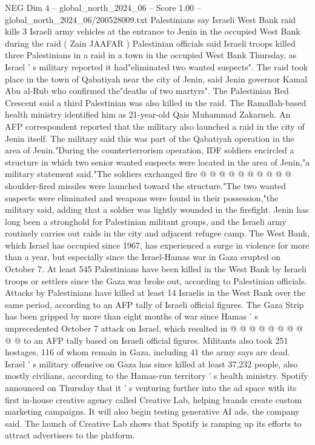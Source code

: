 \begin{textsample}{NEG Dim 4 – global\_north\_2024\_06 – Score 1.00 – global\_north\_2024\_06/200528009.txt}  \label{ex:f4_neg_327}
Palestinians say Israeli West Bank raid kills 3 Israeli army vehicles at the entrance to Jenin in the occupied West Bank during the raid ( Zain JAAFAR ) Palestinian officials said Israeli troops killed three Palestinians in a raid in a town in the occupied West Bank Thursday, as Israel ' s military reported it had"eliminated two wanted suspects".
The raid took place in the town of Qabatiyah near the city of Jenin, said Jenin governor Kamal Abu al-Rub who confirmed the"deaths of two martyrs".
The Palestinian Red Crescent said a third Palestinian was also killed in the raid.
The Ramallah-based health ministry identified him as 21-year-old Qais Muhammad Zakarneh.
An AFP correspondent reported that the military also launched a raid in the city of Jenin itself.
The military said this was part of the Qabatiyah operation in the area of Jenin."During the counterterrorism operation, IDF soldiers encircled a structure in which two senior wanted suspects were located in the area of Jenin,"a military statement said."The soldiers exchanged fire @ @ @ @ @ @ @ @ @ @ shoulder-fired missiles were launched toward the structure."The two wanted suspects were eliminated and weapons were found in their possession,"the military said, adding that a soldier was lightly wounded in the firefight.
Jenin has long been a stronghold for Palestinian militant groups, and the Israeli army routinely carries out raids in the city and adjacent refugee camp.
The West Bank, which Israel has occupied since 1967, has experienced a surge in violence for more than a year, but especially since the Israel-Hamas war in Gaza erupted on October 7.
At least 545 Palestinians have been killed in the West Bank by Israeli troops or settlers since the Gaza war broke out, according to Palestinian officials.
Attacks by Palestinians have killed at least 14 Israelis in the West Bank over the same period, according to an AFP tally of Israeli official figures.
The Gaza Strip has been gripped by more than eight months of war since Hamas ' s unprecedented October 7 attack on Israel, which resulted in @ @ @ @ @ @ @ @ @ @ to an AFP tally based on Israeli official figures.
Militants also took 251 hostages, 116 of whom remain in Gaza, including 41 the army says are dead.
Israel ' s military offensive on Gaza has since killed at least 37,232 people, also mostly civilians, according to the Hamas-run territory ' s health ministry.
Spotify announced on Thursday that it ' s venturing further into the ad space with its first in-house creative agency called Creative Lab, helping brands create custom marketing campaigns.
It will also begin testing generative AI ads, the company said.
The launch of Creative Lab shows that Spotify is ramping up its efforts to attract advertisers to the platform.

\end{textsample}
